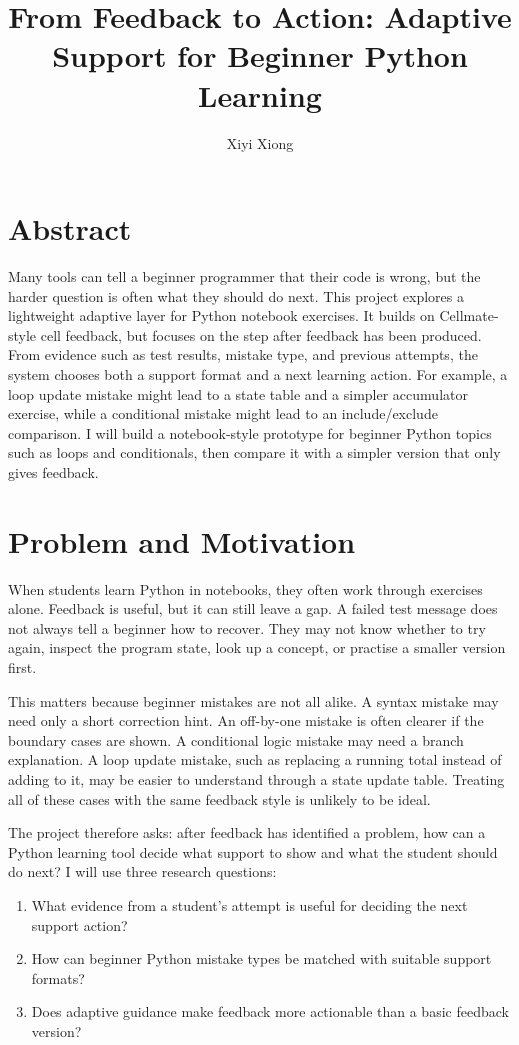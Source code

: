 \documentclass[project-plan]{report-template}
\title{From Feedback to Action: Adaptive Support for Beginner Python Learning}
\author{Xiyi Xiong}
\begin{document}
\maketitlepage

\section*{Abstract}

Many tools can tell a beginner programmer that their code is wrong, but the harder question is often what they should do next. This project explores a lightweight adaptive layer for Python notebook exercises. It builds on Cellmate-style cell feedback, but focuses on the step after feedback has been produced. From evidence such as test results, mistake type, and previous attempts, the system chooses both a support format and a next learning action. For example, a loop update mistake might lead to a state table and a simpler accumulator exercise, while a conditional mistake might lead to an include/exclude comparison. I will build a notebook-style prototype for beginner Python topics such as loops and conditionals, then compare it with a simpler version that only gives feedback.

\section{Problem and Motivation}

When students learn Python in notebooks, they often work through exercises alone. Feedback is useful, but it can still leave a gap. A failed test message does not always tell a beginner how to recover. They may not know whether to try again, inspect the program state, look up a concept, or practise a smaller version first.

This matters because beginner mistakes are not all alike. A syntax mistake may need only a short correction hint. An off-by-one mistake is often clearer if the boundary cases are shown. A conditional logic mistake may need a branch explanation. A loop update mistake, such as replacing a running total instead of adding to it, may be easier to understand through a state update table. Treating all of these cases with the same feedback style is unlikely to be ideal.

The project therefore asks: after feedback has identified a problem, how can a Python learning tool decide what support to show and what the student should do next? I will use three research questions:

\begin{enumerate}
    \item What evidence from a student's attempt is useful for deciding the next support action?
    \item How can beginner Python mistake types be matched with suitable support formats?
    \item Does adaptive guidance make feedback more actionable than a basic feedback version?
\end{enumerate}
\end{document}
